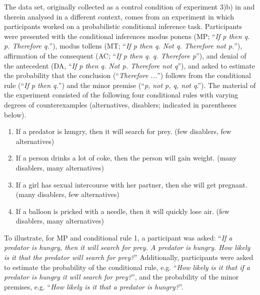 \documentclass[11pt, a4paper]{article}
\theoremstyle{example} \newtheorem{example}{Example}[section]
\theoremstyle{theorem} \newtheorem{theorem}{Theorem}[section]
\begin{document}
The data set, originally collected as a control condition of experiment 3)b) in \citet{singmann+etal:2016} and therein analysed in a different context, comes from an experiment in which participants worked on a probabilistic conditional inference task. Participants were presented with the conditional inferences modus ponens (MP; ``\textit{If p then q. p. Therefore q.}''), modus tollens (MT; ``\textit{If p then q. Not q. Therefore  not p.}''), affirmation of the consequent (AC; ``\textit{If p then q. q. Therefore p}''), and denial of the antecedent (DA, ``\textit{If p then q. Not p. Therefore not q}''), and asked to estimate the probability that the conclusion (``\textit{Therefore ...}'') follows from the conditional rule (``\textit{If p then q.}'') and the minor premise (``\textit{p, not p, q, not q}.''). The material of the experiment consisted of the following four conditional rules with varying degrees of counterexamples (alternatives, disablers; indicated in parentheses below).
\begin{enumerate}
\item If a predator is hungry, then it will search for prey. (few disablers, few alternatives)
\item If a person drinks a lot of coke, then the person will gain weight. (many disablers, many alternatives)
\item If a girl has sexual intercourse with her partner, then she will get pregnant. (many disablers, few alternatives)
\item If a balloon is pricked with a needle, then it will quickly lose air. (few disablers, many alternatives)
\end{enumerate}
To illustrate, for MP and conditional rule 1, a participant was asked: ``\textit{If a predator is hungry, then it will search for prey. A predator is hungry. How likely is it that the predator will search for prey?}'' Additionally, participants were asked to estimate the probability of the conditional rule, e.g. ``\textit{How likely is it that if a predator is hungry it will search for prey?}'', and the probability of the minor premises, e.g. ``\textit{How likely is it that a predator is hungry?}''. 
	
\end{document}
